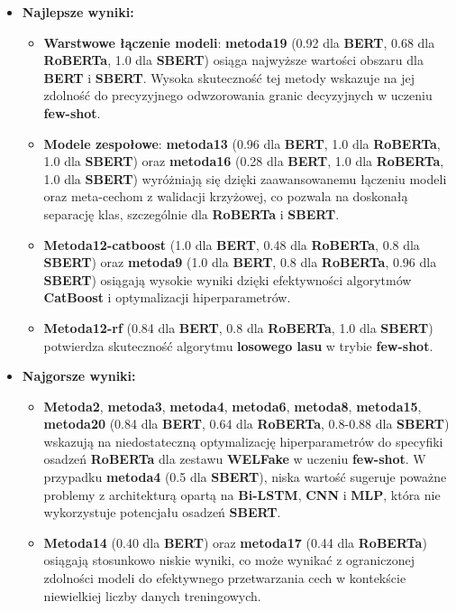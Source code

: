 \begin{itemize}
	\item \textbf{Najlepsze wyniki:}
	      \begin{itemize}
		      \item \textbf{Warstwowe łączenie modeli}: \textbf{metoda19} (0.92 dla \textbf{BERT}, 0.68 dla \textbf{RoBERTa}, 1.0 dla \textbf{SBERT}) osiąga najwyższe wartości obszaru dla \textbf{BERT} i \textbf{SBERT}. Wysoka skuteczność tej metody wskazuje na jej zdolność do precyzyjnego odwzorowania granic decyzyjnych w uczeniu \textbf{few-shot}.
		      \item \textbf{Modele zespołowe}: \textbf{metoda13} (0.96 dla \textbf{BERT}, 1.0 dla \textbf{RoBERTa}, 1.0 dla \textbf{SBERT}) oraz \textbf{metoda16} (0.28 dla \textbf{BERT}, 1.0 dla \textbf{RoBERTa}, 1.0 dla \textbf{SBERT}) wyróżniają się dzięki zaawansowanemu łączeniu modeli oraz meta-cechom z walidacji krzyżowej, co pozwala na doskonałą separację klas, szczególnie dla \textbf{RoBERTa} i \textbf{SBERT}.
		      \item \textbf{Metoda12-catboost} (1.0 dla \textbf{BERT}, 0.48 dla \textbf{RoBERTa}, 0.8 dla \textbf{SBERT}) oraz \textbf{metoda9} (1.0 dla \textbf{BERT}, 0.8 dla \textbf{RoBERTa}, 0.96 dla \textbf{SBERT}) osiągają wysokie wyniki dzięki efektywności algorytmów \textbf{CatBoost} i optymalizacji hiperparametrów.
		      \item \textbf{Metoda12-rf} (0.84 dla \textbf{BERT}, 0.8 dla \textbf{RoBERTa}, 1.0 dla \textbf{SBERT}) potwierdza skuteczność algorytmu \textbf{losowego lasu} w trybie \textbf{few-shot}.
	      \end{itemize}
	\item \textbf{Najgorsze wyniki:}
	      \begin{itemize}
		      \item \textbf{Metoda2}, \textbf{metoda3}, \textbf{metoda4}, \textbf{metoda6}, \textbf{metoda8}, \textbf{metoda15}, \textbf{metoda20} (0.84 dla \textbf{BERT}, 0.64 dla \textbf{RoBERTa}, 0.8-0.88 dla \textbf{SBERT}) wskazują na niedostateczną optymalizację hiperparametrów do specyfiki osadzeń \textbf{RoBERTa} dla zestawu \textbf{WELFake} w uczeniu \textbf{few-shot}. W przypadku \textbf{metoda4} (0.5 dla \textbf{SBERT}), niska wartość sugeruje poważne problemy z architekturą opartą na \textbf{Bi-LSTM}, \textbf{CNN} i \textbf{MLP}, która nie wykorzystuje potencjału osadzeń \textbf{SBERT}.
		      \item \textbf{Metoda14} (0.40 dla \textbf{BERT}) oraz \textbf{metoda17} (0.44 dla \textbf{RoBERTa}) osiągają stosunkowo niskie wyniki, co może wynikać z ograniczonej zdolności modeli do efektywnego przetwarzania cech w kontekście niewielkiej liczby danych treningowych.
	      \end{itemize}
\end{itemize}

